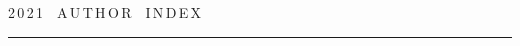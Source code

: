 {%




\raggedleft\Large \bf%


2\,0\,2\,1\ \ A\,U\,T\,H\,O\,R\ \ I\,N\,D\,E\,X \vskip 17pt


 \hrule


 \par


 }





\label{st\stat}





\def\tit{\ }





\def\aut{\ }


\def\auf{\ }





\def\leftkol{\ } %





\def\rightkol{\ } %





\titele{\tit}{\aut}{\auf}{\leftkol}{\rightkol}







\def\leftfootline{\small{\textbf{\thepage}


\hfill INFORMATIKA I EE PRIMENENIYA~--- INFORMATICS AND APPLICATIONS\ \ \ 2021\


\ \ volume~15\ \ \ issue\ 4}


}%


 \def\rightfootline{\small{INFORMATIKA I EE PRIMENENIYA~--- INFORMATICS AND APPLICATIONS\ \ \ 2021\ \ \ volume~15\ \ \ issue\ 4


\hfill \textbf{\thepage}}}





\vspace*{-24pt}





\noindent



